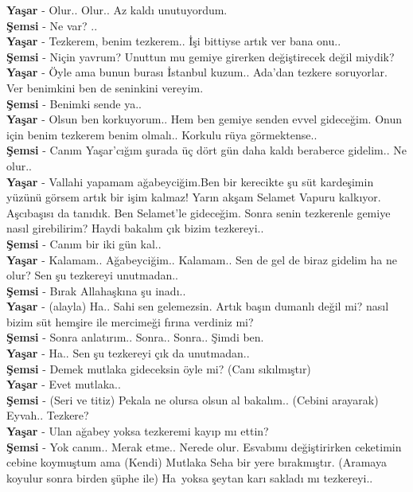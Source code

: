\documentclass[]{book}
\begin{document}
\textbf{Yaşar} - Olur.. Olur.. Az kaldı unutuyordum.\\
\textbf{Şemsi} - Ne var? ..\\
\textbf{Yaşar} - Tezkerem, benim tezkerem.. İşi bittiyse artık ver bana onu..\\
\textbf{Şemsi} - Niçin yavrum? Unuttun mu gemiye girerken değiştirecek değil miydik?\\
\textbf{Yaşar} - Öyle ama bunun burası İstanbul kuzum.. Ada'dan tezkere soruyorlar. Ver benimkini ben de seninkini vereyim.\\
\textbf{Şemsi} - Benimki sende ya..\\
\textbf{Yaşar} - Olsun ben korkuyorum.. Hem ben gemiye senden evvel gideceğim. Onun için benim tezkerem benim olmalı.. Korkulu rüya görmektense..\\
\textbf{Şemsi} - Canım Yaşar'cığım şurada üç dört gün daha kaldı beraberce gidelim.. Ne olur..\\
\textbf{Yaşar} - Vallahi yapamam ağabeyciğim.Ben bir kerecikte şu süt kardeşimin yüzünü görsem artık bir işim kalmaz! Yarın akşam Selamet Vapuru kalkıyor. Aşcıbaşısı da tanıdık. Ben Selamet'le gideceğim. Sonra senin tezkerenle gemiye nasıl girebilirim? Haydi bakalım çık bizim tezkereyi..\\
\textbf{Şemsi} - Canım bir iki gün kal..\\
\textbf{Yaşar} - Kalamam.. Ağabeyciğim.. Kalamam.. Sen de gel de biraz gidelim ha ne olur? Sen şu tezkereyi unutmadan..\\
\textbf{Şemsi} - Bırak Allahaşkına şu inadı..\\
\textbf{Yaşar} - (alayla) Ha.. Sahi sen gelemezsin. Artık başın dumanlı değil mi? nasıl bizim süt hemşire ile mercimeği fırına verdiniz mi?\\
\textbf{Şemsi} - Sonra anlatırım.. Sonra.. Sonra.. Şimdi ben.\\
\textbf{Yaşar} - Ha.. Sen şu tezkereyi çık da unutmadan..\\
\textbf{Şemsi} - Demek mutlaka gideceksin öyle mi? (Canı sıkılmıştır)\\
\textbf{Yaşar} - Evet mutlaka..\\
\textbf{Şemsi} - (Seri ve titiz) Pekala ne olursa olsun al bakalım.. (Cebini arayarak) Eyvah.. Tezkere?\\
\textbf{Yaşar} - Ulan ağabey yoksa tezkeremi kayıp mı ettin?\\
\textbf{Şemsi} - Yok canım.. Merak etme.. Nerede olur. Esvabımı değiştirirken ceketimin cebine koymuştum ama (Kendi) Mutlaka Seha bir yere bırakmıştır. (Aramaya koyulur sonra birden şüphe ile) Ha~yoksa şeytan karı sakladı mı tezkereyi..\\
\end{document}
